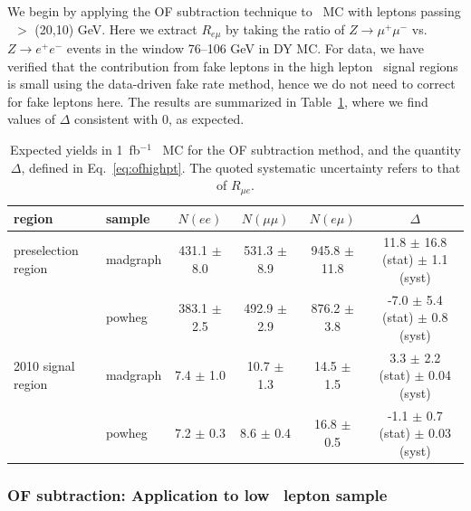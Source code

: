 We begin by applying the OF subtraction technique to \ttbar\ MC with leptons passing \pt\ $>$ (20,10) GeV.
Here we extract $R_{e\mu}$ by taking the ratio of $Z \to \mu^+\mu^-$ vs. $Z \to e^+e^-$ events in the
window 76--106 GeV in DY MC. 
For data, we have verified that the contribution from fake leptons in the high lepton \pt\
signal regions is small using the data-driven fake rate method, hence we do not need to 
correct for fake leptons here. 
The results are summarized in Table~\ref{tab:mcof}, where we find
values of $\Delta$ consistent with 0, as expected.

\begin{table}[hbt]
\begin{center}
\caption{\label{tab:mcof} Expected yields in 1~fb$^{-1}$ \ttbar\ MC for the OF subtraction method,
and the quantity $\Delta$, defined in Eq.~\ref{eq:ofhighpt}.
The quoted systematic uncertainty refers to that of $R_{\mu e}$.
}
\begin{tabular}{llccc|c}
\hline
region                  &     sample  &       $N(ee)$     &      $N(\mu\mu)$   &     $N(e\mu)$      &         $\Delta$   \\ 
\hline

\hline

preselection region     &   madgraph  & 431.1 $\pm$ 8.0   &  531.3 $\pm$ 8.9   &  945.8 $\pm$ 11.8  &  11.8 $\pm$ 16.8 (stat) $\pm$ 1.1 (syst)   \\
                        &   powheg    & 383.1 $\pm$ 2.5   &  492.9 $\pm$ 2.9   &  876.2 $\pm$ 3.8   &  -7.0 $\pm$  5.4 (stat) $\pm$ 0.8 (syst)   \\

\hline

2010 signal region      &   madgraph  &   7.4 $\pm$ 1.0   &   10.7 $\pm$ 1.3   &   14.5 $\pm$ 1.5   &   3.3 $\pm$  2.2 (stat) $\pm$  0.04 (syst) \\
                        &   powheg    &   7.2 $\pm$ 0.3   &    8.6 $\pm$ 0.4   &   16.8 $\pm$ 0.5   &  -1.1 $\pm$  0.7 (stat) $\pm$  0.03 (syst) \\

\hline

\hline
\end{tabular}
\end{center}
\end{table}

\subsubsection{OF subtraction: Application to low \pt\ lepton sample}
\label{sec:oflowpt}

